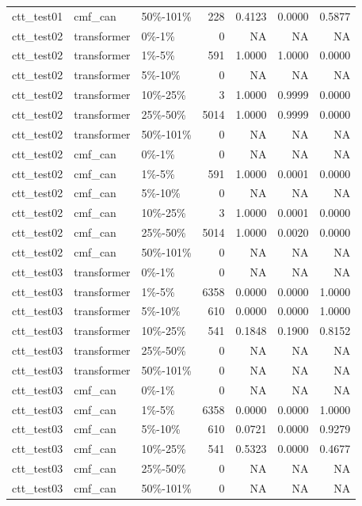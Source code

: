 \begin{tabular}{lllrrrr}
ctt\_test01 & cmf\_can & 50\%-101\% & 228 & 0.4123 & 0.0000 & 0.5877 \\
ctt\_test02 & transformer & 0\%-1\% & 0 & NA & NA & NA \\
ctt\_test02 & transformer & 1\%-5\% & 591 & 1.0000 & 1.0000 & 0.0000 \\
ctt\_test02 & transformer & 5\%-10\% & 0 & NA & NA & NA \\
ctt\_test02 & transformer & 10\%-25\% & 3 & 1.0000 & 0.9999 & 0.0000 \\
ctt\_test02 & transformer & 25\%-50\% & 5014 & 1.0000 & 0.9999 & 0.0000 \\
ctt\_test02 & transformer & 50\%-101\% & 0 & NA & NA & NA \\
ctt\_test02 & cmf\_can & 0\%-1\% & 0 & NA & NA & NA \\
ctt\_test02 & cmf\_can & 1\%-5\% & 591 & 1.0000 & 0.0001 & 0.0000 \\
ctt\_test02 & cmf\_can & 5\%-10\% & 0 & NA & NA & NA \\
ctt\_test02 & cmf\_can & 10\%-25\% & 3 & 1.0000 & 0.0001 & 0.0000 \\
ctt\_test02 & cmf\_can & 25\%-50\% & 5014 & 1.0000 & 0.0020 & 0.0000 \\
ctt\_test02 & cmf\_can & 50\%-101\% & 0 & NA & NA & NA \\
ctt\_test03 & transformer & 0\%-1\% & 0 & NA & NA & NA \\
ctt\_test03 & transformer & 1\%-5\% & 6358 & 0.0000 & 0.0000 & 1.0000 \\
ctt\_test03 & transformer & 5\%-10\% & 610 & 0.0000 & 0.0000 & 1.0000 \\
ctt\_test03 & transformer & 10\%-25\% & 541 & 0.1848 & 0.1900 & 0.8152 \\
ctt\_test03 & transformer & 25\%-50\% & 0 & NA & NA & NA \\
ctt\_test03 & transformer & 50\%-101\% & 0 & NA & NA & NA \\
ctt\_test03 & cmf\_can & 0\%-1\% & 0 & NA & NA & NA \\
ctt\_test03 & cmf\_can & 1\%-5\% & 6358 & 0.0000 & 0.0000 & 1.0000 \\
ctt\_test03 & cmf\_can & 5\%-10\% & 610 & 0.0721 & 0.0000 & 0.9279 \\
ctt\_test03 & cmf\_can & 10\%-25\% & 541 & 0.5323 & 0.0000 & 0.4677 \\
ctt\_test03 & cmf\_can & 25\%-50\% & 0 & NA & NA & NA \\
ctt\_test03 & cmf\_can & 50\%-101\% & 0 & NA & NA & NA \\

\end{tabular}
